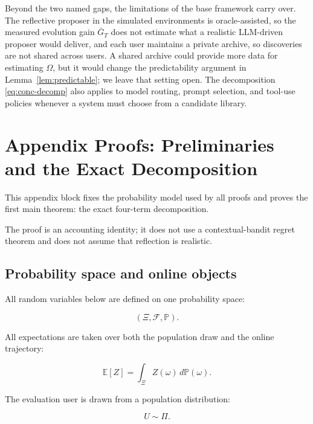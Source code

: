 \documentclass{article} %
\begin{document}
Beyond the two named gaps, the limitations of the base framework carry over. The reflective proposer in the simulated environments is oracle-assisted, so the measured evolution gain $\bar G_T$ does not estimate what a realistic LLM-driven proposer would deliver, and each user maintains a private archive, so discoveries are not shared across users. A shared archive could provide more data for estimating \(\Omega\), but it would change the predictability argument in Lemma~\ref{lem:predictable}; we leave that setting open. The decomposition \eqref{eq:conc-decomp} also applies to model routing, prompt selection, and tool-use policies whenever a system must choose from a candidate library.

\appendix

\section{Appendix Proofs: Preliminaries and the Exact Decomposition}

\label{app:proofs}

This appendix block fixes the probability model used by all proofs and proves the first main theorem: the exact four-term decomposition.

The proof is an accounting identity; it does not use a contextual-bandit regret theorem and does not assume that reflection is realistic.

\subsection{Probability space and online objects}

All random variables below are defined on one probability space:

\begin{equation}
\label{eq:app-probability-space}
(\Xi,\mathcal{F},\mathbb{P}).
\end{equation}

All expectations are taken over both the population draw and the online trajectory:

\begin{equation}
\label{eq:app-expectation}
\mathbb{E}[Z]
=
\int_{\Xi} Z(\omega)\,d\mathbb{P}(\omega).
\end{equation}

The evaluation user is drawn from a population distribution:

\begin{equation}
\label{eq:app-user-draw}
U \sim \Pi.
\end{equation}
\end{document}
